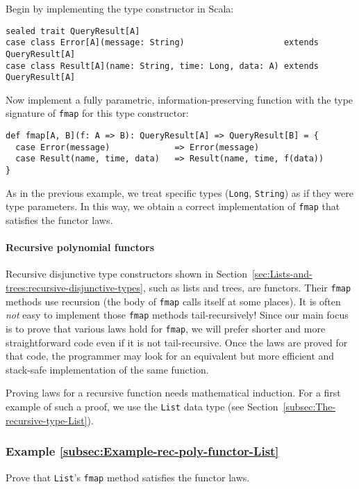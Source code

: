 Begin by implementing the type constructor in Scala:
\begin{lstlisting}
sealed trait QueryResult[A]
case class Error[A](message: String)                    extends QueryResult[A]
case class Result[A](name: String, time: Long, data: A) extends QueryResult[A]
\end{lstlisting}
Now implement a fully parametric, information-preserving function
with the type signature of \lstinline!fmap! for this type constructor:
\begin{lstlisting}
def fmap[A, B](f: A => B): QueryResult[A] => QueryResult[B] = {
  case Error(message)             => Error(message)
  case Result(name, time, data)   => Result(name, time, f(data))
}
\end{lstlisting}
As in the previous example, we treat specific types (\lstinline!Long!,
\lstinline!String!) as if they were type parameters. In this way,
we obtain a correct implementation of \lstinline!fmap! that satisfies
the functor laws.

\paragraph{Recursive polynomial functors}

Recursive disjunctive type constructors shown in Section~\ref{sec:Lists-and-trees:recursive-disjunctive-types},
such as lists and trees, are functors. Their \lstinline!fmap! methods
use recursion (the body of \lstinline!fmap! calls itself at some
places). It is often \emph{not} easy to implement those \lstinline!fmap!
methods tail-recursively! Since our main focus is to prove that various
laws hold for \lstinline!fmap!, we will prefer shorter and more straightforward
code even if it is not tail-recursive. Once the laws are proved for
that code, the programmer may look for an equivalent but more efficient
and stack-safe implementation of the same function.

Proving laws for a recursive function needs mathematical induction.
For a first example of such a proof, we use the \lstinline!List!
data type (see Section~\ref{subsec:The-recursive-type-List}). 

\subsubsection{Example \label{subsec:Example-rec-poly-functor-List}\ref{subsec:Example-rec-poly-functor-List}}

Prove that \lstinline!List!\textsf{'}s \lstinline!fmap! method satisfies
the functor laws.

